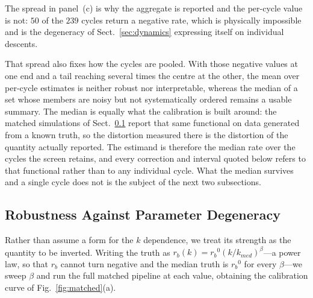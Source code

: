 \documentclass[runningheads]{llncs}
\newcommand{\rb}{\ensuremath{r_{b}}}
\begin{document}
The spread in panel~(c) is why the aggregate is reported and the
per-cycle value is not: $50$ of the $239$ cycles return a negative
rate, which is physically impossible and is the degeneracy of
Sect.~\ref{sec:dynamics} expressing itself on individual descents.

That spread also fixes how the cycles are pooled. With those negative
values at one end and a tail reaching several times the centre at the
other, the mean over per-cycle estimates is neither robust nor
interpretable, whereas the median of a set whose members are noisy but
not systematically ordered remains a usable summary. The median is
equally what the calibration is built around: the matched simulations
of Sect.~\ref{sec:degen} report that same functional on data generated
from a known truth, so the distortion measured there is the distortion
of the quantity actually reported. The estimand is therefore the median
rate over the cycles the screen retains, and every correction and
interval quoted below refers to that functional rather than to any
individual cycle. What the median survives and a single cycle does not
is the subject of the next two subsections.

\subsection{Robustness Against Parameter Degeneracy}
\label{sec:degen}

Rather than assume a form for the $k$ dependence, we treat its strength
as the quantity to be inverted. Writing the truth as
$\rb(k)=\rb^{0}(k/k_{med})^{\beta}$---a power law, so that \rb{} cannot
turn negative and the median truth is $\rb^{0}$ for every
$\beta$---we sweep $\beta$ and run the full matched pipeline at each
value, obtaining the calibration curve of Fig.~\ref{fig:matched}(a).
\end{document}
